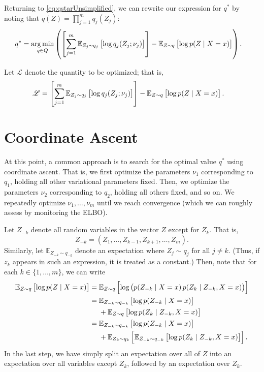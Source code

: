\documentclass[11pt]{article}
\newcommand{\sL}{\mathscr{L}}
\begin{document}
Returning to \eqref{eq:qstarUnsimplified}, we can rewrite our expression for $q^*$ by noting that $q(Z) = \prod_{j=1}^m q_j(Z_j)$:
\begin{align}
q^*
&= \operatorname*{arg\,min}_{q \in Q} \left(
    \left[ \sum_{j=1}^m \mathbb{E}_{\substack{Z_j \sim q_j}}\left[ \log q_j(Z_j; \nu_j) \right] \right]
    -
    \mathbb{E}_{\substack{Z \sim q}}\left[ \log p(Z \mid X = x) \right]
\right).
\end{align}

Let $\sL$ denote the quantity to be optimized; that is,
\begin{align}
\label{eq:beforeRemovingConstWrtK}
\sL
&=
\left[ \sum_{j=1}^m \expectOver{Z_j \sim q_j}{\log q_j(Z_j; \nu_j)} \right]
    -
    \expectOver{Z \sim q}{\log p(Z \mid X = x)}.
\end{align}

\section{Coordinate Ascent}

At this point, a common approach is to search for the optimal value $q^*$ using coordinate ascent.
That is, we first optimize the parameters $\nu_1$ corresponding to $q_1$, holding all other variational parameters fixed.
Then, we optimize the parameters $\nu_2$ corresponding to $q_2$, holding all others fixed, and so on.
We repeatedly optimize $\nu_1, \ldots, \nu_m$ until we reach convergence (which we can roughly assess by monitoring the ELBO).

Let $Z_{-k}$ denote all random variables in the vector $Z$ except for $Z_k$.
That is, \begin{equation} Z_{-k} = (Z_1, \ldots, Z_{k-1}, Z_{k+1}, \ldots, Z_m). \end{equation}
Similarly, let $\mathbb E_{Z_{-k} \sim q_{-k}}$ denote an expectation where $Z_j \sim q_j$ for all $j \neq k$.
(Thus, if $z_k$ appears in such an expression, it is treated as a constant.)
Then, note that for each $k \in \{1, \ldots, m\}$, we can write
\begin{align}
\expectOver{Z \sim q}{\log p(Z \mid X = x)}
&= \expectOver{Z \sim q}{ \log \left( p(Z_{-k} \mid X = x) \, p(Z_k \mid Z_{-k}, X = x) \right) } \\
%
&= \begin{aligned}[t]
&\expectOver{Z_{-k} \sim q_{-k}}{ \log p(Z_{-k} \mid X = x) } \\
&+ \expectOver{Z \sim q}{ \log p(Z_k \mid Z_{-k}, X = x) }
\end{aligned} \\
%
&= \begin{aligned}[t]
&\expectOver{Z_{-k} \sim q_{-k}}{ \log p(Z_{-k} \mid X = x) } \\
&+ \expectOver{Z_k \sim q_k}{ \expectOver{Z_{-k} \sim q_{-k}}{ \log p(Z_k \mid Z_{-k}, X = x) } }.
\end{aligned}
\end{align}
In the last step, we have simply split an expectation over all of $Z$ into an expectation over all variables except $Z_k$, followed by an expectation over $Z_k$.
\end{document}
